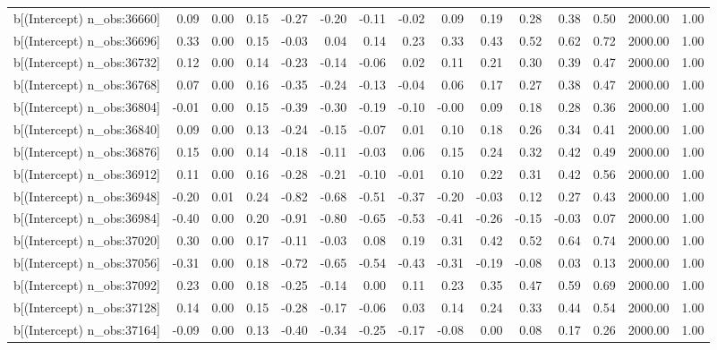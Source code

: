 \begin{table}[ht]
\begin{tabular}{rrrrrrrrrrrrrrr}
  b[(Intercept) n\_obs:36660] & 0.09 & 0.00 & 0.15 & -0.27 & -0.20 & -0.11 & -0.02 & 0.09 & 0.19 & 0.28 & 0.38 & 0.50 & 2000.00 & 1.00 \\ 
  b[(Intercept) n\_obs:36696] & 0.33 & 0.00 & 0.15 & -0.03 & 0.04 & 0.14 & 0.23 & 0.33 & 0.43 & 0.52 & 0.62 & 0.72 & 2000.00 & 1.00 \\ 
  b[(Intercept) n\_obs:36732] & 0.12 & 0.00 & 0.14 & -0.23 & -0.14 & -0.06 & 0.02 & 0.11 & 0.21 & 0.30 & 0.39 & 0.47 & 2000.00 & 1.00 \\ 
  b[(Intercept) n\_obs:36768] & 0.07 & 0.00 & 0.16 & -0.35 & -0.24 & -0.13 & -0.04 & 0.06 & 0.17 & 0.27 & 0.38 & 0.47 & 2000.00 & 1.00 \\ 
  b[(Intercept) n\_obs:36804] & -0.01 & 0.00 & 0.15 & -0.39 & -0.30 & -0.19 & -0.10 & -0.00 & 0.09 & 0.18 & 0.28 & 0.36 & 2000.00 & 1.00 \\ 
  b[(Intercept) n\_obs:36840] & 0.09 & 0.00 & 0.13 & -0.24 & -0.15 & -0.07 & 0.01 & 0.10 & 0.18 & 0.26 & 0.34 & 0.41 & 2000.00 & 1.00 \\ 
  b[(Intercept) n\_obs:36876] & 0.15 & 0.00 & 0.14 & -0.18 & -0.11 & -0.03 & 0.06 & 0.15 & 0.24 & 0.32 & 0.42 & 0.49 & 2000.00 & 1.00 \\ 
  b[(Intercept) n\_obs:36912] & 0.11 & 0.00 & 0.16 & -0.28 & -0.21 & -0.10 & -0.01 & 0.10 & 0.22 & 0.31 & 0.42 & 0.56 & 2000.00 & 1.00 \\ 
  b[(Intercept) n\_obs:36948] & -0.20 & 0.01 & 0.24 & -0.82 & -0.68 & -0.51 & -0.37 & -0.20 & -0.03 & 0.12 & 0.27 & 0.43 & 2000.00 & 1.00 \\ 
  b[(Intercept) n\_obs:36984] & -0.40 & 0.00 & 0.20 & -0.91 & -0.80 & -0.65 & -0.53 & -0.41 & -0.26 & -0.15 & -0.03 & 0.07 & 2000.00 & 1.00 \\ 
  b[(Intercept) n\_obs:37020] & 0.30 & 0.00 & 0.17 & -0.11 & -0.03 & 0.08 & 0.19 & 0.31 & 0.42 & 0.52 & 0.64 & 0.74 & 2000.00 & 1.00 \\ 
  b[(Intercept) n\_obs:37056] & -0.31 & 0.00 & 0.18 & -0.72 & -0.65 & -0.54 & -0.43 & -0.31 & -0.19 & -0.08 & 0.03 & 0.13 & 2000.00 & 1.00 \\ 
  b[(Intercept) n\_obs:37092] & 0.23 & 0.00 & 0.18 & -0.25 & -0.14 & 0.00 & 0.11 & 0.23 & 0.35 & 0.47 & 0.59 & 0.69 & 2000.00 & 1.00 \\ 
  b[(Intercept) n\_obs:37128] & 0.14 & 0.00 & 0.15 & -0.28 & -0.17 & -0.06 & 0.03 & 0.14 & 0.24 & 0.33 & 0.44 & 0.54 & 2000.00 & 1.00 \\ 
  b[(Intercept) n\_obs:37164] & -0.09 & 0.00 & 0.13 & -0.40 & -0.34 & -0.25 & -0.17 & -0.08 & 0.00 & 0.08 & 0.17 & 0.26 & 2000.00 & 1.00 \\ 

\end{tabular}
\end{table}
